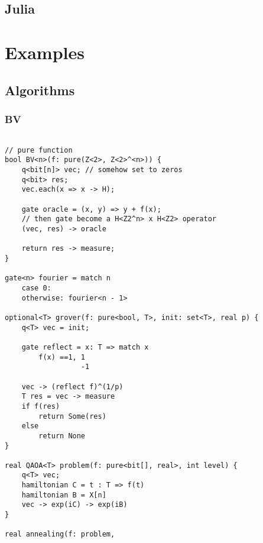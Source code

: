 \documentclass[a4paper,11pt]{article}
\begin{document}
\subsection{Julia}
\section{Examples}
\subsection{Algorithms}
\subsubsection{BV}

\begin{lstlisting}

// pure function
bool BV<n>(f: pure(Z<2>, Z<2>^<n>)) {
    q<bit[n]> vec; // somehow set to zeros
    q<bit> res;
    vec.each(x => x -> H);
    
    gate oracle = (x, y) => y + f(x);
    // then gate become a H<Z2^n> x H<Z2> operator
    (vec, res) -> oracle
    
    return res -> measure; 
}

gate<n> fourier = match n 
    case 0: 
    otherwise: fourier<n - 1>
    
optional<T> grover(f: pure<bool, T>, init: set<T>, real p) {
    q<T> vec = init;
    
    gate reflect = x: T => match x
        f(x) ==1, 1
                  -1
    
    vec -> (reflect f)^(1/p)
    T res = vec -> measure
    if f(res)
        return Some(res)
    else
        return None
}

real QAOA<T> problem(f: pure<bit[], real>, int level) {
    q<T> vec;
    hamiltonian C = t : T => f(t)
    hamiltonian B = X[n]
    vec -> exp(iC) -> exp(iB)
}

real annealing(f: problem, 

\end{lstlisting}
\end{document}
